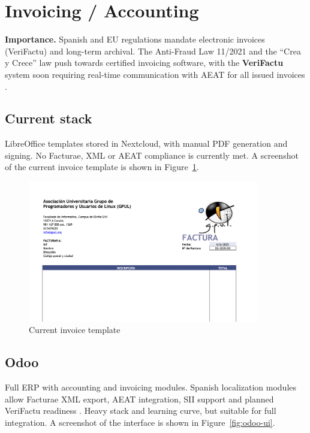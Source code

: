 \section{Invoicing / Accounting}

\textbf{Importance.} Spanish and EU regulations mandate electronic invoices (VeriFactu) and long-term archival. The Anti-Fraud Law 11/2021 and the ``Crea y Crece'' law push towards certified invoicing software, with the \textbf{VeriFactu} system soon requiring real-time communication with AEAT for all issued invoices \cite{OdooBlogVerifactu, SageVerifactu}.

\subsection{Current stack}
LibreOffice templates stored in Nextcloud, with manual PDF generation and signing. No Facturae, XML or AEAT compliance is currently met. A screenshot of the current invoice template is shown in Figure~\ref{fig:invoice}.

\begin{figure}[H]
  \centering
  \includegraphics[width=0.9\textwidth]{imaxes/invoice.png}
  \caption{Current invoice template}
  \label{fig:invoice}
\end{figure}

\subsection{Odoo}
Full ERP with accounting and invoicing modules. Spanish localization modules allow Facturae XML export, AEAT integration, SII support and planned VeriFactu readiness \cite{OdooEInvoiceSpain, OdooBlogVerifactu}. Heavy stack and learning curve, but suitable for full integration. A screenshot of the interface is shown in Figure~\ref{fig:odoo-ui}.

